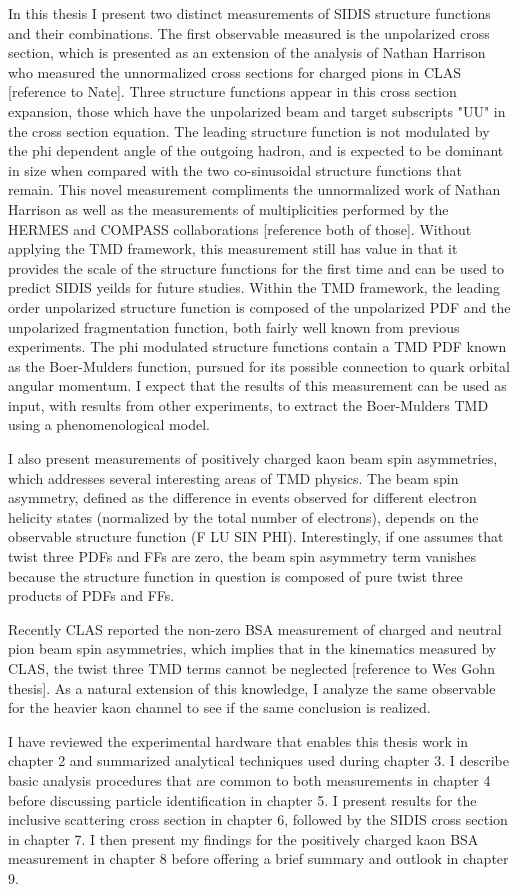 In this thesis I present two distinct measurements of SIDIS structure functions and their combinations.  The first observable measured is the unpolarized cross section, which is presented as an extension of the analysis of Nathan Harrison who measured the unnormalized cross sections for charged pions in CLAS [reference to Nate].  Three structure functions appear in this cross section expansion, those which have the unpolarized beam and target subscripts "UU" in the cross section equation.  The leading structure function is not modulated by the phi dependent angle of the outgoing hadron, and is expected to be dominant in size when compared with the two co-sinusoidal structure functions that remain.  This novel measurement compliments the unnormalized work of Nathan Harrison as well as the measurements of multiplicities performed by the HERMES and COMPASS collaborations [reference both of those].  Without applying the TMD framework, this measurement still has value in that it provides the scale of the structure functions for the first time and can be used to predict SIDIS yeilds for future studies.  Within the TMD framework, the leading order unpolarized structure function is composed of the unpolarized PDF and the unpolarized fragmentation function, both fairly well known from previous experiments.  The phi modulated structure functions contain a TMD PDF known as the Boer-Mulders function, pursued for its possible connection to quark orbital angular momentum.  I expect that the results of this measurement can be used as input, with results from other experiments, to extract the Boer-Mulders TMD using a phenomenological model.

I also present measurements of positively charged kaon beam spin asymmetries, which addresses several interesting areas of TMD physics.  The beam spin asymmetry, defined as the difference in events observed for different electron helicity states (normalized by the total number of electrons), depends on the observable structure function (F LU SIN PHI).  Interestingly, if one assumes that twist three PDFs and FFs are zero, the beam spin asymmetry term vanishes because the structure function in question is composed of pure twist three products of PDFs and FFs.

Recently CLAS reported the non-zero BSA measurement of charged and neutral pion beam spin asymmetries, which implies that in the kinematics measured by CLAS, the twist three TMD terms cannot be neglected [reference to Wes Gohn thesis].  As a natural extension of this knowledge, I analyze the same observable for the heavier kaon channel to see if the same conclusion is realized.

I have reviewed the experimental hardware that enables this thesis work in chapter 2 and summarized analytical techniques used during chapter 3.  I describe basic analysis procedures that are common to both measurements in chapter 4 before discussing particle identification in chapter 5.  I present results for the inclusive scattering cross section in chapter 6, followed by the SIDIS cross section in chapter 7.  I then present my findings for the positively charged kaon BSA measurement in chapter 8 before offering a brief summary and outlook in chapter 9. 
